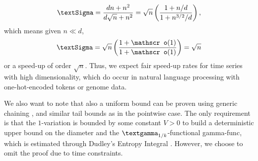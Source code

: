 \documentclass[openany]{book}
\begin{document}
\begin{equation*}
    \gSigma=\frac{dn+n^2}{d\sqrt{n}+n^2}=\sqrt{n}\left(\frac{1+n/d}{1+n^{3/2}/d}\right),
\end{equation*} 
which means given $n\ll d$,
\begin{equation*}
    \gSigma =\sqrt{n}\left(\frac{1+\mathscr o(1)}{1+\mathscr o(1)}\right)=\sqrt{n}
\end{equation*}
or a speed-up of order $\sqrt{n}$. Thus, we expect fair speed-up rates for time series with high dimensionality, which do occur in natural language processing with one-hot-encoded tokens or genome data.\par We also want to note that also a uniform bound can be proven using generic chaining \cite{talagrand2005}, \cite{dirksen2015} and similar tail bounds as in the pointwise case. The only requirement is that the $1$-variation is bounded by some constant $V>0$ to build a deterministic upper bound on the diameter and the $\ggamma_{1/k}$-functional \gls{gamma-func}\cite{talagrand2005}, which is estimated through Dudley's Entropy Integral \cite{dirksen2015}. However, we choose to omit the proof due to time constraints.
\printnoidxglossary[
  type=symbols,
  style=list,
  title={List of Abbreviations and Symbols}
]
\printbibliography
\end{document}
